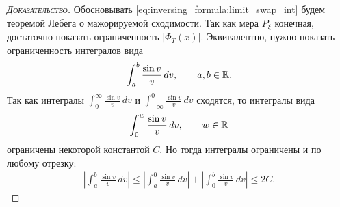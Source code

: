 \documentclass[../main.tex]{subfiles}
\begin{document}
\begin{proof}[\normalfont\textsc{Доказательство}]
 Обосновывать \eqref{eq:inversing_formula:limit_swap_int} будем теоремой Лебега о мажорируемой сходимости. Так как мера $ P_\xi $ конечная, достаточно показать ограниченность $ \left| \Phi_T(x) \right| $. Эквивалентно, нужно показать ограниченность интегралов вида
 \begin{align*}
  \int_{a}^{b} \frac{\sin v}{v}\,dv, \qquad a,b\in\mathbb{R}.
 \end{align*} Так как интегралы  $ \int_{0}^{\infty} \frac{\sin v}{v}\,dv  $ и $ \int_{-\infty}^{0} \frac{\sin v}{v}\,dv  $ сходятся, то интегралы вида
 \begin{align*}
  \int_{0}^{w} \frac{\sin v}{v}\,dv, \qquad w \in \mathbb{R}
 \end{align*}  ограничены некоторой константой $ C $. Но тогда интегралы ограничены и по любому отрезку:
 \begin{align*}
  \left| \int_{a}^{b} \frac{\sin v}{v}\,dv \right| \leqslant \left| \int_{a}^{0} \frac{\sin v}{v}\,dv \right| + \left| \int_{0}^{b} \frac{\sin v}{v}\,dv \right| \leqslant 2C.
 \end{align*}


\end{proof}
\end{document}

